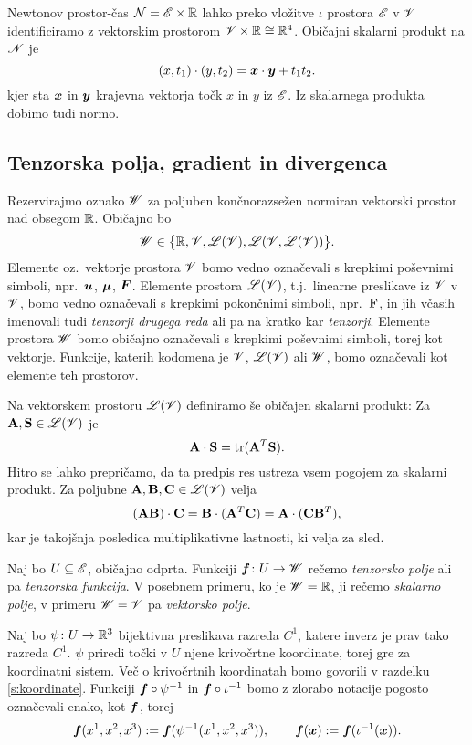 Newtonov prostor-čas $\mathcal{N}=\mathscr E\times\mathbb R$ lahko preko vložitve $\iota$ prostora $\mathscr E$ v $\mathscr V$
identificiramo z vektorskim prostorom $\mathscr V\times\mathbb R\cong\mathbb R^4$. Običajni skalarni produkt na $\mathscr N$ je
\[ (x,t_1)\cdot(y,t_2) = \boldsymbol x\cdot\boldsymbol y + t_1 t_2. \]
kjer sta $\boldsymbol x$ in $\boldsymbol y$ krajevna vektorja točk $x$ in $y$ iz $\mathscr E$.
Iz skalarnega produkta dobimo tudi normo.


\subsection{Tenzorska polja, gradient in divergenca}


Rezervirajmo oznako $\mathscr W$ za poljuben končnorazsežen normiran vektorski
prostor nad obsegom $\mathbb R$. Običajno bo
\[ \mathscr W\in\big\{ \mathbb R,\mathscr V,\mathscr L(\mathscr V),\mathscr L(\mathscr V,\mathscr L(\mathscr V)) \big\}. \]
Elemente oz.~vektorje prostora $\mathscr V$ bomo vedno označevali s krepkimi poševni\-mi simboli,
npr.~$\boldsymbol u$, $\boldsymbol \mu$, $\boldsymbol F$. Elemente prostora $\mathscr L(\mathscr V)$, t.j.~linearne
preslikave iz $\mathscr V$ v $\mathscr V$, bomo vedno označevali s krepkimi pokončnimi simboli, npr.~$\mathbf F$,
in jih včasih imenovali tudi \emph{tenzorji drugega reda} ali pa na kratko kar \emph{tenzorji}.
Elemente prostora $\mathscr W$ bomo običajno označevali s krepkimi poševnimi simboli, torej kot vektorje.
Funkcije, katerih kodomena je $\mathscr V$, $\mathscr L(\mathscr V)$ ali $\mathscr W$, bomo označevali kot elemente teh prostorov.

Na vektorskem prostoru $\mathscr L(\mathscr V)$ definiramo še običajen skalarni produkt: Za $\mathbf A,\mathbf S\in\mathscr L(\mathscr V)$ je
\[ \mathbf A\cdot\mathbf S=\mathrm{tr}(\mathbf A^{T}\mathbf S). \]
Hitro se lahko prepričamo, da ta predpis res ustreza vsem pogojem za skalarni produkt.
Za poljubne $\mathbf A,\mathbf B,\mathbf C\in\mathscr L(\mathscr V)$ velja
\begin{equation} \label{e:skatra}
	(\mathbf A\mathbf B)\cdot\mathbf C=\mathbf B\cdot(\mathbf A^{T}\mathbf C)=\mathbf A\cdot(\mathbf C\mathbf B^{T}),
\end{equation}
kar je takojšnja posledica multiplikativne lastnosti, ki velja za sled.

Naj bo $U\subseteq\mathscr E$, običajno odprta. Funkciji $\boldsymbol f\colon U\to\mathscr W$ rečemo \emph{tenzorsko polje} ali pa
\emph{tenzorska funkcija}. V posebnem primeru, ko je $\mathscr W=\mathbb R$, ji rečemo \emph{skalarno polje},
v primeru $\mathscr W=\mathscr V$ pa \emph{vektorsko polje}.

Naj bo $\psi\colon U\to\mathbb R^3$ bijektivna preslikava razreda $C^1$, katere inverz je prav tako
razreda $C^1$. $\psi$ priredi točki v $U$ njene krivočrtne koordinate, torej gre za koordinatni sistem.
Več o krivočrtnih koordinatah bomo govorili v razdelku \ref{s:koordinate}.
Funkciji $\boldsymbol f\circ\psi^{-1}$ in $\boldsymbol f\circ\iota^{-1}$ bomo z zlorabo notacije pogosto
označevali enako, kot $\boldsymbol f$, torej
\[
	\boldsymbol f(x^1,x^2,x^3):=\boldsymbol f(\psi^{-1}(x^1,x^2,x^3)),\qquad
	\boldsymbol f(\boldsymbol x):=\boldsymbol f(\iota^{-1}(\boldsymbol x)).
\]


